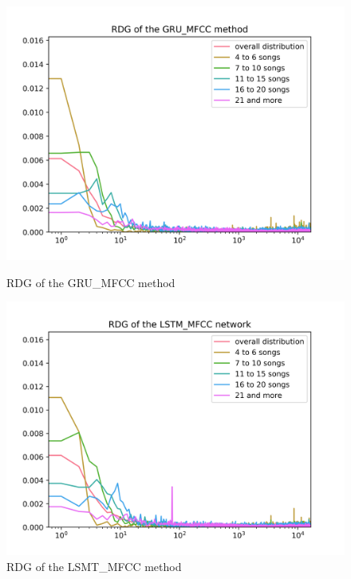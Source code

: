 \begin{figure}[H]
\centering
\begin{minipage}{.45\textwidth}
  \centering
  \includegraphics[width=1\linewidth]{./img/gru_mfcc_graph.png}
  \caption[RDG of the GRU\_MFCC method]{RDG of the \newline GRU\_MFCC method}
  \label{fig:gru_mfcc_distribution}
\end{minipage}
 \vspace{1cm}
\begin{minipage}{.45\textwidth}
  \centering
  \includegraphics[width=1\linewidth]{./img/lstm_mfcc_graph.png}
  \caption[RDG of the LSMT\_MFCC method]{RDG of the \newline LSMT\_MFCC method}
  \label{fig:lstm_mfcc_distribution}
\end{minipage}
\end{figure}\label{fig:mfcc_nn_distributions}

